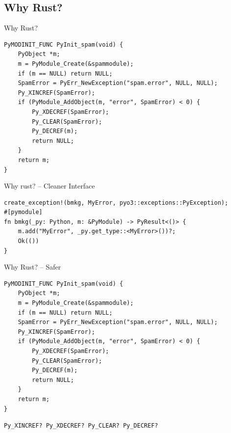 \documentclass[aspectratio=169]{ctexbeamer}
\begin{document}
\subsection{Why Rust?}

\begin{frame}[fragile]{Why Rust?}
\begin{verbatim}
PyMODINIT_FUNC PyInit_spam(void) {
    PyObject *m;
    m = PyModule_Create(&spammodule);
    if (m == NULL) return NULL;
    SpamError = PyErr_NewException("spam.error", NULL, NULL);
    Py_XINCREF(SpamError);
    if (PyModule_AddObject(m, "error", SpamError) < 0) {
        Py_XDECREF(SpamError);
        Py_CLEAR(SpamError);
        Py_DECREF(m);
        return NULL;
    }
    return m;
}
\end{verbatim}
\end{frame}
\begin{frame}[fragile]{Why rust? -- Cleaner Interface}
    \begin{verbatim}
create_exception!(bmkg, MyError, pyo3::exceptions::PyException);
#[pymodule]
fn bmkg(_py: Python, m: &PyModule) -> PyResult<()> {
    m.add("MyError", _py.get_type::<MyError>())?;
    Ok(())
}
    \end{verbatim}
\end{frame}
\begin{frame}[fragile]{Why Rust? -- Safer}
\begin{verbatim}
PyMODINIT_FUNC PyInit_spam(void) {
    PyObject *m;
    m = PyModule_Create(&spammodule);
    if (m == NULL) return NULL;
    SpamError = PyErr_NewException("spam.error", NULL, NULL);
    Py_XINCREF(SpamError);
    if (PyModule_AddObject(m, "error", SpamError) < 0) {
        Py_XDECREF(SpamError);
        Py_CLEAR(SpamError);
        Py_DECREF(m);
        return NULL;
    }
    return m;
}
\end{verbatim}
\texttt{Py_XINCREF? Py_XDECREF? Py_CLEAR? Py_DECREF?}
\end{frame}
\end{document}
